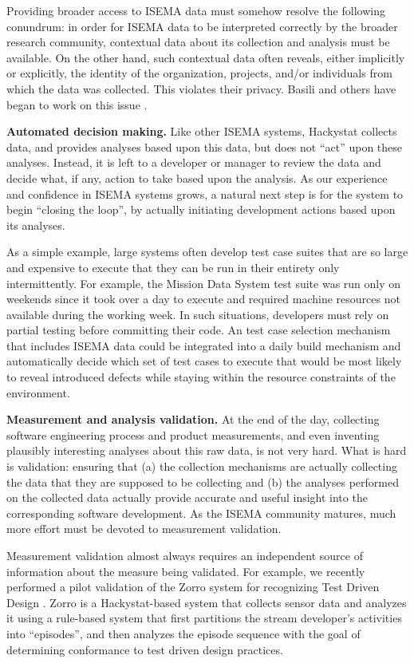 \documentclass[10pt,twocolumn]{article}
\begin{document}
Providing broader access to ISEMA data must somehow resolve the following
conundrum: in order for ISEMA data to be interpreted correctly by the
broader research community, contextual data about its collection and
analysis must be available.  On the other hand, such contextual data often
reveals, either implicitly or explicitly, the identity of the organization,
projects, and/or individuals from which the data was collected.  This
violates their privacy.  Basili and others have began to work on this issue
\cite{Basili06}.

{\bf Automated decision making.}  Like other ISEMA systems, Hackystat
collects data, and provides analyses based upon this data, but does not
``act'' upon these analyses. Instead, it is left to a developer or manager
to review the data and decide what, if any, action to take based upon the
analysis.  As our experience and confidence in ISEMA systems grows, a
natural next step is for the system to begin ``closing the loop'', by
actually initiating development actions based upon its analyses.

As a simple example, large systems often develop test case suites that are
so large and expensive to execute that they can be run in their entirety
only intermittently.  For example, the Mission Data System test suite was
run only on weekends since it took over a day to execute and required
machine resources not available during the working week.  In such
situations, developers must rely on partial testing before committing their
code.  An test case selection mechanism that includes ISEMA data could be
integrated into a daily build mechanism and automatically decide which set
of test cases to execute that would be most likely to reveal introduced
defects while staying within the resource constraints of the environment.

{\bf Measurement and analysis validation.} At the end of the day,
collecting software engineering process and product measurements, and even
inventing plausibly interesting analyses about this raw data, is not very
hard.  What is hard is validation: ensuring that (a) the collection
mechanisms are actually collecting the data that they are supposed to be
collecting and (b) the analyses performed on the collected data actually
provide accurate and useful insight into the corresponding software
development.  As the ISEMA community matures, much more effort must be
devoted to measurement validation.

Measurement validation almost always requires an independent source of
information about the measure being validated.  For example, we recently
performed a pilot validation of the Zorro system for recognizing Test
Driven Design \cite{csdl2-06-02}.  Zorro is a Hackystat-based system that
collects sensor data and analyzes it using a rule-based system that first
partitions the stream developer's activities into ``episodes'', and then
analyzes the episode sequence with the goal of determining conformance to
test driven design practices.
\end{document}
